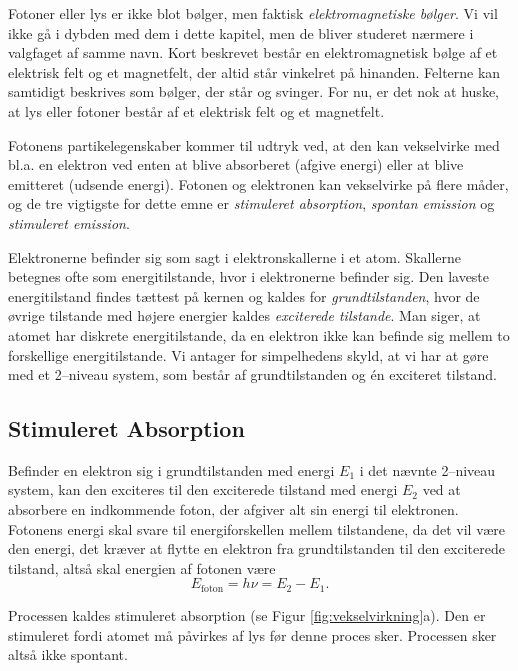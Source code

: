 Fotoner eller lys er ikke blot bølger, men faktisk \emph{elektromagnetiske bølger}. Vi vil ikke gå i dybden med dem i dette kapitel, men de bliver studeret nærmere i valgfaget af samme navn. 
Kort beskrevet består en elektromagnetisk bølge af et elektrisk felt og et magnetfelt, der altid står vinkelret på hinanden. Felterne kan samtidigt beskrives som bølger, der står og svinger. For nu, er det nok at huske, at lys eller fotoner består af et elektrisk felt og et magnetfelt. 

Fotonens partikelegenskaber kommer til udtryk ved, at den kan vekselvirke med bl.a. en elektron ved enten at blive absorberet (afgive energi) eller at blive emitteret (udsende energi). Fotonen og elektronen kan vekselvirke på flere måder, og de tre vigtigste for dette emne er \emph{stimuleret absorption}, \emph{spontan emission} og \emph{stimuleret emission}.

Elektronerne befinder sig som sagt i elektronskallerne i et atom. Skallerne betegnes ofte som energitilstande, hvor i elektronerne befinder sig. Den laveste energitilstand findes tættest på kernen og kaldes for \emph{grundtilstanden}, hvor de øvrige tilstande med højere energier kaldes \emph{exciterede tilstande}. Man siger, at atomet har diskrete energitilstande, da en elektron ikke kan befinde sig mellem to forskellige energitilstande. Vi antager for simpelhedens skyld, at vi har at gøre med et 2--niveau system, som består af grundtilstanden og én exciteret tilstand. 


\subsection{Stimuleret Absorption}
Befinder en elektron sig i grundtilstanden med energi $E_1$ i det nævnte 2--niveau system, kan den exciteres til den exciterede tilstand med energi $E_2$ ved at absorbere en indkommende foton, der afgiver alt sin energi til elektronen. Fotonens energi skal svare til energiforskellen mellem tilstandene, da det vil være den energi, det kræver at flytte en elektron fra grundtilstanden til den exciterede tilstand, altså skal energien af fotonen være
\begin{equation}
E_{\text{foton}} = h\nu =  E_2-E_1.
\label{eq:efot}
\end{equation}


Processen kaldes stimuleret absorption (se Figur \ref{fig:vekselvirkning}a). Den er stimuleret fordi atomet må påvirkes af lys før denne proces sker. Processen sker altså ikke spontant. 

